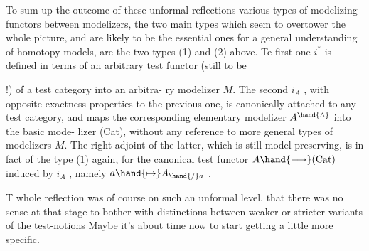 To sum up the outcome of these unformal reflections   various
types of modelizing functors between modelizers,  the two main types which
seem to overtower the whole picture,  and are likely to be the essential
ones for a general understanding of homotopy models,  are the two types
(1) and (2)  above.  Te first one $i^{*}$ is defined in terms of an arbitrary
test functor (still to be  !)  of a test category into an arbitra-%
ry modelizer $M$.  The second $i_A$ ,  with opposite exactness properties to
the previous one,  is canonically attached to any test category,  and
 maps the corresponding elementary modelizer  $A^{\hand{\wedge}}$ into the basic mode-%
lizer (Cat),  without any reference to more general types of modelizers $M$.
The right adjoint of the latter,  which is still model preserving,  is
in fact of the type (1) again,  for the canonical test functor $A \hand{\longrightarrow} (\mathrm{Cat})$
induced by $i_A$ ,  namely $a \hand{\mapsto} A_{\hand{/}a}$ .   T whole reflection was of course on
such an unformal level,  that there was no sense at that stage to bother
with distinctions between weaker or stricter  variants of the test-notions
Maybe it's about time now to start getting a little more specific.


